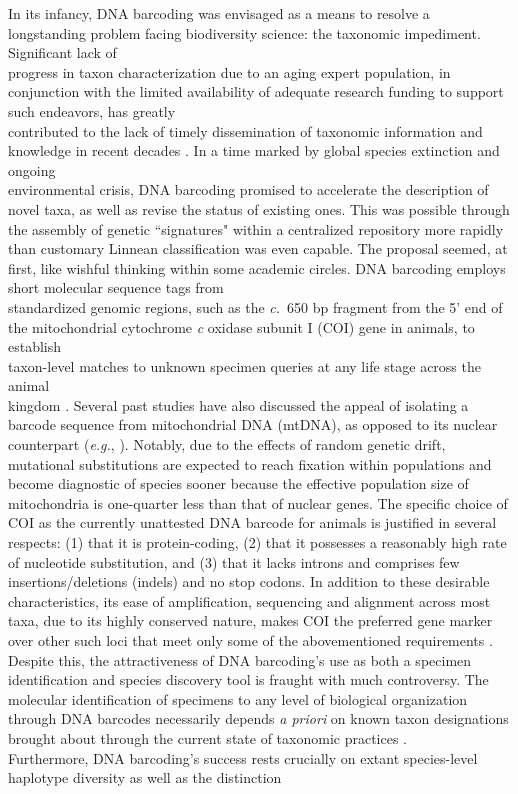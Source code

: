 In its infancy, DNA barcoding \cite{hebert2003biological}  was envisaged as a means to resolve a longstanding problem facing biodiversity science: the taxonomic impediment. 
Significant lack of \\ progress in taxon characterization due to an aging expert population, in conjunction with the limited availability of adequate research funding to support such endeavors, has greatly \\ contributed to the lack of timely dissemination of taxonomic information and knowledge in recent decades \cite{cao2016rapid}. In a time marked by global species extinction and ongoing \\ environmental crisis, DNA barcoding promised to accelerate the description of novel taxa, as well as revise the status of existing ones. This was possible through the assembly of genetic ``signatures" within a centralized repository more rapidly than customary Linnean classification was even capable. The proposal seemed, at first, like wishful thinking within some academic circles. DNA barcoding employs short molecular sequence tags from \\ standardized genomic regions, such as the \textit{c.}~650 bp fragment from the 5' end of the mitochondrial cytochrome \textit{c} oxidase subunit I (COI) gene in animals, to establish \\ taxon-level matches to unknown specimen queries at any life stage across the animal \\ kingdom \cite{hebert2003barcoding}. Several past studies have also discussed the appeal of isolating a barcode sequence from mitochondrial DNA (mtDNA), as opposed to its nuclear counterpart (\textit{e.g.}, \cite{hubert2015dna, hubert2008identifying}). Notably, due to the effects of random genetic drift, mutational substitutions are expected to reach fixation within populations and become diagnostic of species sooner because the effective population size of mitochondria is one-quarter less than that of nuclear genes. The specific choice of COI as the currently unattested DNA barcode for animals is justified in several respects: (1) that it is protein-coding, (2) that it possesses a reasonably high rate of  nucleotide substitution, and (3) that it lacks introns and comprises few \\ insertions/deletions (indels) and no stop codons. In addition to these desirable \\ characteristics, its ease of amplification, sequencing and alignment across most taxa, due to its highly conserved nature, makes COI the preferred gene marker over other such loci that meet only some of the abovementioned requirements \cite{phillips2019incomplete}. Despite this, the attractiveness of DNA barcoding's use as both a specimen identification and species discovery tool is fraught with much controversy. The molecular identification of specimens to any level of biological organization through DNA barcodes necessarily depends \textit{a priori} on known taxon designations brought about through the current state of taxonomic practices \cite{desalle2006species}. \\ Furthermore, DNA barcoding's success rests crucially on extant species-level haplotype diversity as well as the distinction 